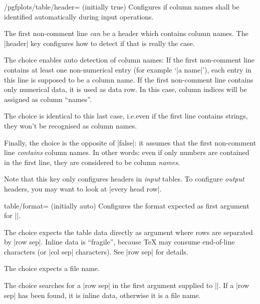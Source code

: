 \begin{key}{/pgfplots/table/header= (initially true)}
    Configures if column names shall be identified automatically during input
    operations.

    The first non-comment line \emph{can} be a header which contains column
    names. The |header| key configures how to detect if that is really the
    case.

    The choice  enables auto detection of column names: If
    the first non-comment line contains at least one non-numerical entry (for
    example `|a name|'), each entry in this line is supposed to be a column
    name. If the first non-comment line contains only numerical data, it is
    used as data row. In this case, column indices will be assigned as column
    ``names''.

    The choice  is identical to this last case, i.e.\@ even
    if the first line contains strings, they won't be recognised as column
    names.

    Finally, the choice  is the opposite of |false|:
    it assumes that the first non-comment line \emph{contains} column names.
    In other words: even if only numbers are contained in the first line, they
    are considered to be column \emph{names}.

    Note that this key only configures headers in \emph{input} tables. To
    configure \emph{output} headers, you may want to look at |every head row|.
\end{key}

\begin{pgfplotskey}{table/format= (initially auto)}
    Configures the format expected as first argument for
    |\pgfplotstableread|.

    The choice  expects the table data directly as argument
    where rows are separated by |row sep|. Inline data is ``fragile'', because
    \TeX{} may consume end-of-line characters (or |col sep| characters). See
    |row sep| for details.

    The choice  expects a file name.

    The choice  searches for a |row sep| in the first
    argument supplied to |\pgfplotstableread|. If a |row sep| has been found,
    it is inline data, otherwise it is a file name.
\end{pgfplotskey}

